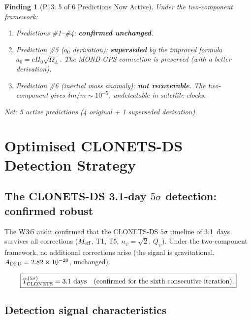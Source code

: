 \documentclass[11pt]{article}
\newtheorem{finding}{Finding}
\newcommand{\ee}[1]{\times 10^{#1}}
\newcommand{\Meff}{M_{\rm eff}}
\newcommand{\Hzero}{H_0}
\newcommand{\aM}{a_0}
\newcommand{\OmL}{\Omega_\Lambda}
\begin{document}
\begin{finding}[P13: 5 of 6 Predictions Now Active]
\label{find:P13-5of6}
Under the two-component framework:
\begin{enumerate}[nosep]
\item Predictions \#1--\#4: \textbf{confirmed unchanged}.
\item Prediction \#5 ($\aM$ derivation): \textbf{superseded} by the
  improved formula $\aM = c\Hzero\sqrt{\OmL}$. The MOND-GPS connection
  is preserved (with a better derivation).
\item Prediction \#6 (inertial mass anomaly): \textbf{not recoverable}.
  The two-component gives $\delta m/m \sim 10^{-5}$, undetectable
  in satellite clocks.
\end{enumerate}
Net: 5 active predictions (4 original + 1 superseded derivation).
\end{finding}

\section{Optimised CLONETS-DS Detection Strategy}
\label{sec:CLONETS-strategy}

\subsection{The CLONETS-DS 3.1-day $5\sigma$ detection: confirmed robust}

The W3i5 audit confirmed that the CLONETS-DS $5\sigma$ timeline of 3.1~days
survives all corrections ($\Meff$, T1, T5, $n_\psi = \sqrt{2}$, $Q_\psi$).
Under the two-component framework, no additional corrections arise (the
signal is gravitational, $A_{\rm DFD} = 2.82\ee{-20}$, unchanged).

\begin{equation}
\boxed{T_{\rm CLONETS}^{(5\sigma)} = 3.1~\text{days}
\quad\text{(confirmed for the sixth consecutive iteration).}}
\end{equation}

\subsection{Detection signal characteristics}
\end{document}
